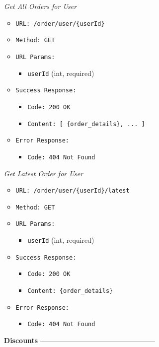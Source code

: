 \begin{itemize}
\begin{itemize}
\begin{itemize}
\begin{itemize}
\item[\textit{Get All Orders for User}]
\begin{itemize}
  \item \texttt{URL: /order/user/\{userId\}}
  \item \texttt{Method: GET}
  \item \texttt{URL Params:}
    \begin{itemize}
      \item \texttt{userId} (int, required)
    \end{itemize}
  \item \texttt{Success Response:}
    \begin{itemize}
      \item \texttt{Code: 200 OK}
      \item \texttt{Content: [ \{order\_details\}, ... ]}
    \end{itemize}
  \item \texttt{Error Response:}
    \begin{itemize}
      \item \texttt{Code: 404 Not Found}
    \end{itemize}
\end{itemize}

\item[\textit{Get Latest Order for User}]
\begin{itemize}
  \item \texttt{URL: /order/user/\{userId\}/latest}
  \item \texttt{Method: GET}
  \item \texttt{URL Params:}
    \begin{itemize}
      \item \texttt{userId} (int, required)
    \end{itemize}
  \item \texttt{Success Response:}
    \begin{itemize}
      \item \texttt{Code: 200 OK}
      \item \texttt{Content: \{order\_details\}}
    \end{itemize}
  \item \texttt{Error Response:}
    \begin{itemize}
      \item \texttt{Code: 404 Not Found}
    \end{itemize}
\end{itemize}


  \item[\textbf{Discounts}] --------------------------------------------------


\end{itemize}
\end{itemize}
\end{itemize}
\end{itemize}

